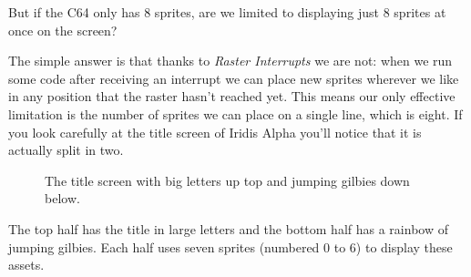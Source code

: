 But if the C64 only has 8 sprites, are we limited to displaying
just 8 sprites at once on the screen?

The simple
answer is that thanks to \textit{Raster Interrupts} we are not: when we run
some code after receiving an interrupt we can place new
sprites wherever we like in any position that the raster hasn't
reached yet. This means our only effective limitation is the number of
sprites we can place on a single line, which is eight.  If you look carefully at the title screen of Iridis Alpha you'll notice that it is actually
split in two.

\begin{figure}[H]
  {
    \begin{adjustbox}{width=10cm,center}
    \end{adjustbox}
  }
\caption{The title screen with big letters up top and jumping gilbies down below.}
\end{figure}

The top half has the title in large letters and the bottom half has a rainbow
of jumping gilbies. Each half uses seven sprites (numbered 0 to 6) to display these assets.


